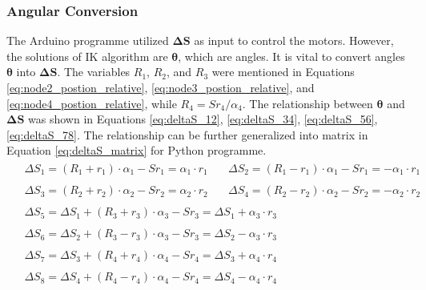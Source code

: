 \subsubsection{Angular Conversion}
The Arduino programme utilized $\boldsymbol{\Delta S}$ as input to control the motors. However, the solutions of IK 
algorithm are $\boldsymbol{\theta}$, which are angles. It is vital to convert angles $\boldsymbol{\theta}$ 
into $\boldsymbol{\Delta S}$. The variables $R_1$, $R_2$, and $R_3$ were mentioned in Equations 
\ref{eq:node2_postion_relative}, \ref{eq:node3_postion_relative}, and \ref{eq:node4_postion_relative}, while 
$R_4 = {Sr}_4/ \alpha_4$. The relationship between $\boldsymbol{\theta}$ and $\boldsymbol{\Delta S}$ was shown in 
Equations \ref{eq:deltaS_12}, \ref{eq:deltaS_34}, \ref{eq:deltaS_56}, \ref{eq:deltaS_78}. The relationship can be 
further generalized into matrix in Equation \ref{eq:deltaS_matrix} for Python programme.
\begin{align}
    &\begin{aligned}
        \Delta S_1=(R_1+r_1)\cdot\alpha_1-Sr_1 = \alpha_1\cdot r_1
    \end{aligned} 
    \quad
    \begin{aligned}
        \Delta S_2=(R_1-r_1)\cdot\alpha_1-Sr_1 = -\alpha_1\cdot r_1
    \end{aligned} 
    \label{eq:deltaS_12} \\
    &\begin{aligned} 
        \Delta S_3=(R_2+r_2)\cdot\alpha_2-Sr_2 = \alpha_2\cdot r_2
    \end{aligned}
    \quad
    \begin{aligned}
        \Delta S_4=(R_2-r_2)\cdot\alpha_2-Sr_2 = -\alpha_2\cdot r_2
    \end{aligned}
    \label{eq:deltaS_34} \\
    &\begin{aligned}
        \Delta S_5= \Delta S_1+ (R_3+r_3)\cdot\alpha_3-Sr_3 = \Delta S_1+\alpha_3\cdot r_3
    \end{aligned} \nonumber
    \\
    &\begin{aligned}
        \Delta S_6= \Delta S_2 + (R_3-r_3)\cdot\alpha_3-Sr_3 = \Delta S_2-\alpha_3\cdot r_3
    \end{aligned}
    \label{eq:deltaS_56} \\
    &\begin{aligned} 
        \Delta S_7=\Delta S_3+(R_4+r_4)\cdot\alpha_4-Sr_4 = \Delta S_3+\alpha_4\cdot r_4
    \end{aligned} \nonumber
    \\
    &\begin{aligned}
        \Delta S_8=\Delta S_4+(R_4-r_4)\cdot\alpha_4-Sr_4 = \Delta S_4-\alpha_4\cdot r_4
    \end{aligned}
    \label{eq:deltaS_78}
\end{align}
